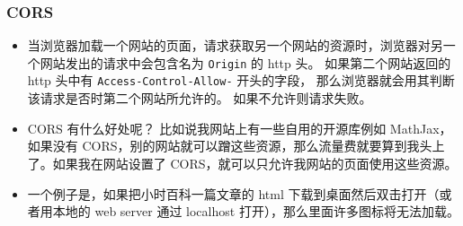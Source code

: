 \subsubsection{CORS}
\begin{itemize}
\item 当浏览器加载一个网站的页面，请求获取另一个网站的资源时，浏览器对另一个网站发出的请求中会包含名为 \verb`Origin` 的 http 头。 如果第二个网站返回的 http 头中有 \verb`Access-Control-Allow-` 开头的字段， 那么浏览器就会用其判断该请求是否时第二个网站所允许的。 如果不允许则请求失败。
\item CORS 有什么好处呢？ 比如说我网站上有一些自用的开源库例如 MathJax，如果没有 CORS，别的网站就可以蹭这些资源，那么流量费就要算到我头上了。如果我在网站设置了 CORS，就可以只允许我网站的页面使用这些资源。
\item 一个例子是，如果把小时百科一篇文章的 html 下载到桌面然后双击打开（或者用本地的 web server 通过 localhost 打开），那么里面许多图标将无法加载。
\end{itemize}
 